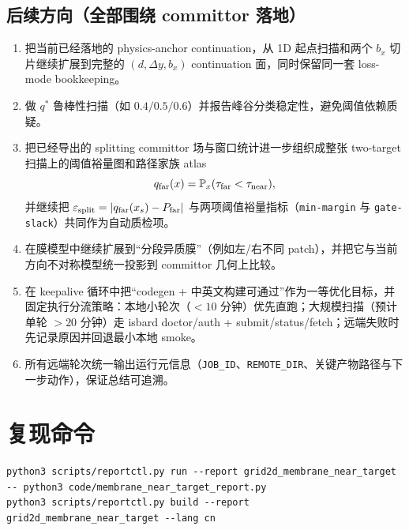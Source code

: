 \documentclass[11pt,fontset=fandol]{ctexart}
\begin{document}
\subsection*{后续方向（全部围绕 committor 落地）}
\begin{enumerate}
  \item 把当前已经落地的 physics-anchor continuation，从 1D 起点扫描和两个 $b_x$ 切片继续扩展到完整的 $(d,\Delta y,b_x)$ continuation 面，同时保留同一套 loss-mode bookkeeping。
  \item 做 $q^*$ 鲁棒性扫描（如 $0.4/0.5/0.6$）并报告峰谷分类稳定性，避免阈值依赖质疑。
  \item 把已经导出的 splitting committor 场与窗口统计进一步组织成整张 two-target 扫描上的阈值裕量图和路径家族 atlas
  \[
  q_{\rm far}(x)=\mathbb P_x(\tau_{\rm far}<\tau_{\rm near}),
  \]
  并继续把 $\varepsilon_{\rm split}=|q_{\rm far}(x_s)-P_{\rm far}|$ 与两项阈值裕量指标（\texttt{min-margin} 与 \texttt{gate-slack}）共同作为自动质检项。
  \item 在膜模型中继续扩展到“分段异质膜”（例如左/右不同 patch），并把它与当前方向不对称模型统一投影到 committor 几何上比较。
  \item 在 keepalive 循环中把“codegen + 中英文构建可通过”作为一等优化目标，并固定执行分流策略：本地小轮次（$<10$ 分钟）优先直跑；大规模扫描（预计单轮 $>20$ 分钟）走 isbard doctor/auth + submit/status/fetch；远端失败时先记录原因并回退最小本地 smoke。
  \item 所有远端轮次统一输出运行元信息（\texttt{JOB\_ID}、\texttt{REMOTE\_DIR}、关键产物路径与下一步动作），保证总结可追溯。
\end{enumerate}

\section*{复现命令}
\begin{verbatim}
python3 scripts/reportctl.py run --report grid2d_membrane_near_target -- python3 code/membrane_near_target_report.py
python3 scripts/reportctl.py build --report grid2d_membrane_near_target --lang cn
\end{verbatim}
\end{document}
